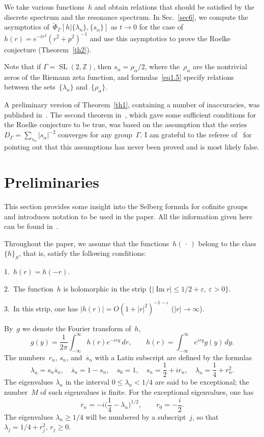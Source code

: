 \documentclass{amsart}
\theoremstyle{plain}
\theoremstyle{definition}
\numberwithin{equation}{section}
\begin{document}
We take various functions~$h$ and obtain relations that should be
satisfied by the discrete spectrum and the resonance spectrum. In
Sec.~\ref{sec6}, we compute the asymptotics
of~$\widetilde\Phi_\Gamma[h|\{\lambda_n\},\{s_\alpha\}]$ as $t \to
0$ for the case of $h(r)=e^{-tr^2}(r^2+p^2)^{-1}$ and use this
asymptotics to prove the Roelke conjecture (Theorem~\ref{th2}).

Note that if $\Gamma=\operatorname{SL}(2,\mathbb{Z})$, then
$s_\alpha=\rho_\alpha/2$, where the~$\rho_\alpha$ are the
nontrivial zeros of the Riemann zeta function, and
formulas~\eqref{eq1.5} specify relations between the
sets~$\{\lambda_n\}$ and~$\{\rho_\alpha\}$.

A preliminary version of Theorem~\ref{th1}, containing a number of
inaccuracies, was published in~\cite{11}. The second theorem
in~\cite{11}, which gave some sufficient conditions for the Roelke
conjecture to be true, was based on the assumption that the series
$D_\Gamma=\sum_{s_\alpha}|s_\alpha|^{-2}$ converges for any
group~$\Gamma$. I am grateful to the referee of~\cite{11} for
pointing out that this assumptions has never been proved and is
most likely false.



\section{Preliminaries}
\label{sec2}

This section provides some insight into the Selberg formula for
cofinite groups and introduces notation to be used in the paper.
All the information given here can be found
in~\cite{1,3,12,13,14,15,16,17}.

Throughout the paper, we assume that the functions~$h(\,\cdot\,)$
belong to the class~$\{h\}_S$, that is, satisfy the following
conditions:

1.~$h(r)=h(-r)$.

2.~The function~$h$ is holomorphic in the strip
$\{|\operatorname{Im}r|\leqslant 1/2+\varepsilon,\
\varepsilon>0\}$.

3.~In this strip, one has $|h(r)|=O(1+|r|^2)^{-1-\varepsilon}$
($|r|\to\infty$).

By~$g$ we denote the Fourier transform of~$h$,
\begin{equation}
\label{eq2.1}
g(y)=\frac{1}{2\pi}\int_{-\infty}^\infty h(r)e^{-iry}\,dr,\qquad
h(r)=\int_{-\infty}^\infty e^{iry}g(y)\,dy.
\end{equation}
The numbers~$r_n$, $s_n$, and~$\overline{s}_n$ with a Latin
subscript are defined by the formulas
\begin{equation}
\label{eq2.2}
\lambda_n=s_n\overline{s}_n,\quad
\overline{s}_n=1-s_n,\quad
s_0=1,\quad
s_n=\frac12+ir_n,\quad
\lambda_n=\frac14+r_n^2.
\end{equation}
The eigenvalues $\lambda_n$ in the interval $0\leqslant
\lambda_n<1/4$ are said to be exceptional; the number~$M$ of such
eigenvalues is finite. For the exceptional eigenvalues, one has
$$
r_n=-i\biggl(\frac14-\lambda_n\biggr)^{1/2},\qquad
r_0=-\frac{i}2.
$$
The eigenvalues $\lambda_n\geqslant 1/4$ will be numbered by a
subscript~$j$, so that $\lambda_j=1/4+r_j^2$, $r_j\geqslant0$.
\end{document}
